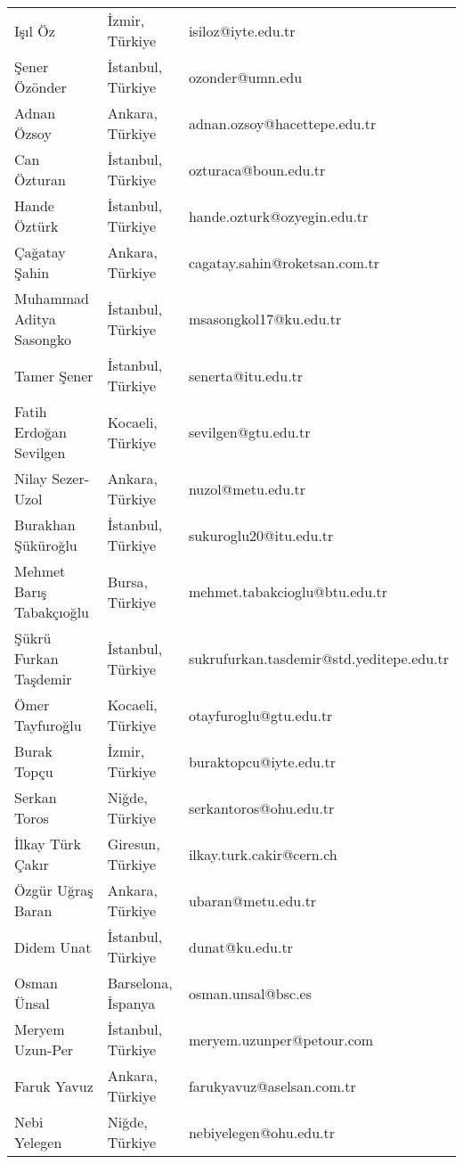 {\begin{longtable}[c]{@{}lll@{}}
\rowcolor[HTML]{C0C0C0} 
Işıl Öz & İzmir, Türkiye & isiloz@iyte.edu.tr \\
Şener Özönder & İstanbul, Türkiye & ozonder@umn.edu \\
\rowcolor[HTML]{C0C0C0} 
Adnan Özsoy & Ankara, Türkiye & adnan.ozsoy@hacettepe.edu.tr \\
Can Özturan & İstanbul, Türkiye & ozturaca@boun.edu.tr \\
\rowcolor[HTML]{C0C0C0} 
Hande Öztürk & İstanbul, Türkiye & hande.ozturk@ozyegin.edu.tr \\
Çağatay Şahin & Ankara, Türkiye & cagatay.sahin@roketsan.com.tr \\
\rowcolor[HTML]{C0C0C0} 
Muhammad Aditya Sasongko & İstanbul, Türkiye & msasongkol17@ku.edu.tr \\
Tamer Şener & İstanbul, Türkiye & senerta@itu.edu.tr \\
\rowcolor[HTML]{C0C0C0} 
Fatih Erdoğan Sevilgen & Kocaeli, Türkiye & sevilgen@gtu.edu.tr \\
Nilay Sezer-Uzol & Ankara, Türkiye & nuzol@metu.edu.tr \\
\rowcolor[HTML]{C0C0C0} 
Burakhan Şüküroğlu & İstanbul, Türkiye & sukuroglu20@itu.edu.tr \\
Mehmet Barış Tabakçıoğlu & Bursa, Türkiye & mehmet.tabakcioglu@btu.edu.tr \\
\rowcolor[HTML]{C0C0C0} 
Şükrü Furkan Taşdemir & İstanbul, Türkiye & sukrufurkan.tasdemir@std.yeditepe.edu.tr \\
Ömer Tayfuroğlu & Kocaeli, Türkiye & otayfuroglu@gtu.edu.tr \\
\rowcolor[HTML]{C0C0C0} 
Burak Topçu & İzmir, Türkiye & buraktopcu@iyte.edu.tr \\
Serkan Toros & Niğde, Türkiye & serkantoros@ohu.edu.tr \\
\rowcolor[HTML]{C0C0C0} 
İlkay Türk Çakır & Giresun, Türkiye & ilkay.turk.cakir@cern.ch \\
Özgür Uğraş Baran & Ankara, Türkiye & ubaran@metu.edu.tr \\
\rowcolor[HTML]{C0C0C0} 
Didem Unat & İstanbul, Türkiye & dunat@ku.edu.tr \\
Osman Ünsal & Barselona, İspanya & osman.unsal@bsc.es \\
\rowcolor[HTML]{C0C0C0} 
Meryem Uzun-Per & İstanbul, Türkiye & meryem.uzunper@petour.com \\
Faruk Yavuz & Ankara, Türkiye & farukyavuz@aselsan.com.tr \\
\rowcolor[HTML]{C0C0C0} 
Nebi Yelegen & Niğde, Türkiye & nebiyelegen@ohu.edu.tr \\

\end{longtable}}
